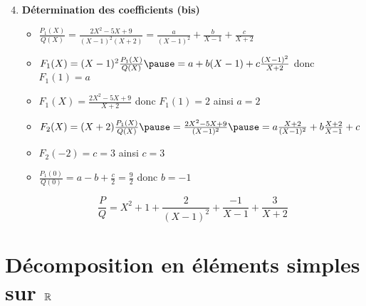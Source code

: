 \begin{frame}
\begin{exemple}
\begin{enumerate}
\setcounter{enumi}{3}
  \item \textbf{Détermination des coefficients (bis)}
  \begin{itemize}
  \setlength{\itemsep}{5pt} 
    \item $\frac{P_1(X)}{Q(X)} =  \frac{2X^2-5X+9}{(X-1)^2(X+2)} = \frac{a}{(X-1)^2} + \frac{b}{X-1} + \frac{c}{X+2}$
\pause
    \item $F_1(X)= (X-1)^2 \frac{P_1(X)}{Q(X)} \pause = a + b(X-1) + c\frac{(X-1)^2}{X+2}$ \pause donc $F_1(1)=a$
\pause
    \item $F_1(X) = \frac{2X^2-5X+9}{X+2}$ \pause donc $F_1(1)=2$ \pause ainsi $a=2$
\pause
    \item $F_2(X) = (X+2)\frac{P_1(X)}{Q(X)} \pause = \frac{2X^2-5X+9}{(X-1)^2} \pause = a\frac{X+2}{(X-1)^2} + b\frac{X+2}{X-1} + c$
\pause
    \item $F_2(-2) = c = 3$ ainsi $c=3$
\pause    
    \item $\frac{P_1(0)}{Q(0)} = a - b + \frac c2 = \frac{9}{2}$ donc $b=-1$
  \end{itemize}    
\pause  
{\small
$$\frac{P}{Q} =  X^2+1 + \frac{2}{(X-1)^2} + \frac{-1}{X-1} + \frac{3}{X+2}$$
}

\end{enumerate}
\end{exemple}
\end{frame}


\section{Décomposition en éléments simples sur $\mathbb{R}$}

